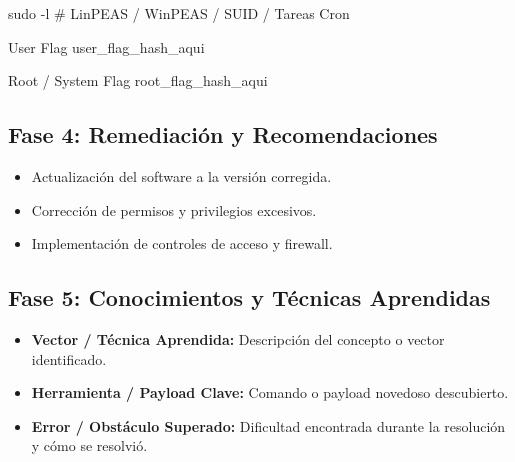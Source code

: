 \documentclass[../../../main_compilation.tex]{subfiles}
\begin{document}
\begin{terminal}
	sudo -l
	# LinPEAS / WinPEAS / SUID / Tareas Cron
\end{terminal}

\begin{flagbox}{User Flag}
	user_flag_hash_aqui
\end{flagbox}

\begin{flagbox}{Root / System Flag}
	root_flag_hash_aqui
\end{flagbox}

\subsection{Fase 4: Remediación y Recomendaciones}

\begin{mitigationbox}
	\begin{itemize}[leftmargin=*]
		\item Actualización del software a la versión corregida.
		\item Corrección de permisos y privilegios excesivos.
		\item Implementación de controles de acceso y firewall.
	\end{itemize}
\end{mitigationbox}

\subsection{Fase 5: Conocimientos y Técnicas Aprendidas}

\begin{learningbox}
	\begin{itemize}[leftmargin=*]
		\item \textbf{Vector / Técnica Aprendida:} Descripción del concepto o vector identificado.
		\item \textbf{Herramienta / Payload Clave:} Comando o payload novedoso descubierto.
		\item \textbf{Error / Obstáculo Superado:} Dificultad encontrada durante la resolución y cómo se resolvió.
	\end{itemize}
\end{learningbox}

\begin{sourcebox}
	\begin{itemize}[leftmargin=*]
	\end{itemize}
\end{sourcebox}
\end{document}
